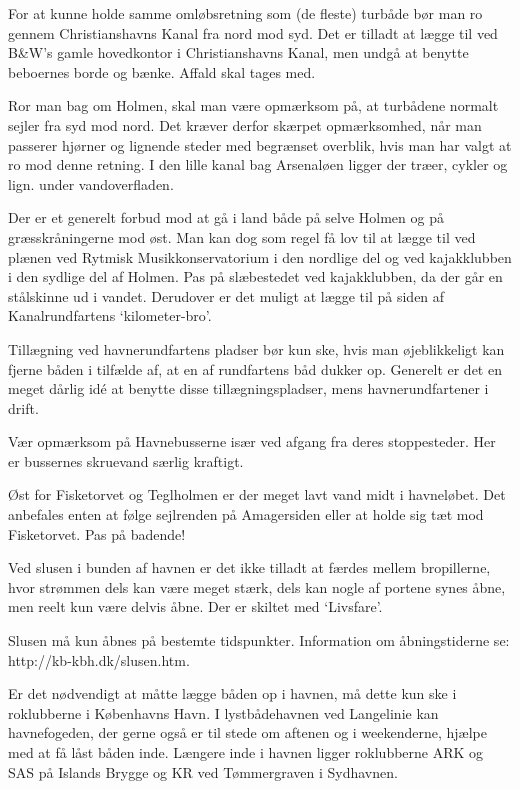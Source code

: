 \documentclass{article}
\begin{document}
For at kunne holde samme omløbsretning som (de fleste) turbåde bør man ro
gennem Christianshavns Kanal fra nord mod syd. Det er tilladt at lægge
til ved B\&W’s gamle hovedkontor i Christianshavns Kanal, men undgå at
benytte beboernes borde og bænke. Affald skal tages med.

Ror man bag om Holmen, skal man være opmærksom på, at turbådene normalt
sejler fra syd mod nord. Det kræver derfor skærpet opmærksomhed, når man
passerer hjørner og lignende steder med begrænset overblik, hvis man har
valgt at ro mod denne retning.  I den lille kanal bag Arsenaløen ligger
der træer, cykler og lign. under vandoverfladen.

Der er et generelt forbud mod at gå i land både på selve Holmen og på
græsskråningerne mod øst. Man kan dog som regel få lov til at lægge til
ved plænen ved Rytmisk Musikkonservatorium i den nordlige del og ved
kajakklubben i den sydlige del af Holmen. Pas på slæbestedet ved
kajakklubben, da der går en stålskinne ud i vandet. Derudover er det
muligt at lægge til på siden af Kanalrundfartens `kilometer-bro'.

Tillægning ved havnerundfartens pladser bør kun ske, hvis man
øjeblikkeligt kan fjerne båden i tilfælde af, at en af rundfartens båd
dukker op. Generelt er det en meget dårlig idé at benytte disse
tillægningspladser, mens havnerundfartener i drift.

Vær opmærksom på Havnebusserne især ved afgang fra deres stoppesteder.
Her er bussernes skruevand særlig kraftigt.

Øst for Fisketorvet og Teglholmen er der meget lavt vand midt i
havneløbet. Det anbefales enten at følge sejlrenden på Amagersiden eller
at holde sig tæt mod Fisketorvet. Pas på badende!

Ved slusen i bunden af havnen er det ikke tilladt at færdes mellem
bropillerne, hvor strømmen dels kan være meget stærk, dels kan nogle af
portene synes åbne, men reelt kun være delvis åbne. Der er skiltet med
`Livsfare'.

Slusen må kun åbnes på bestemte tidspunkter. Information om
åbningstiderne se: http://kb-kbh.dk/slusen.htm.

Er det nødvendigt at måtte lægge båden op i havnen, må dette kun ske i
roklubberne i Københavns Havn. I lystbådehavnen ved Langelinie kan
havnefogeden, der gerne også er til stede om aftenen og i weekenderne,
hjælpe med at få låst båden inde. Længere inde i havnen ligger
roklubberne ARK og SAS på Islands Brygge og KR ved Tømmergraven i
Sydhavnen.
\end{document}
